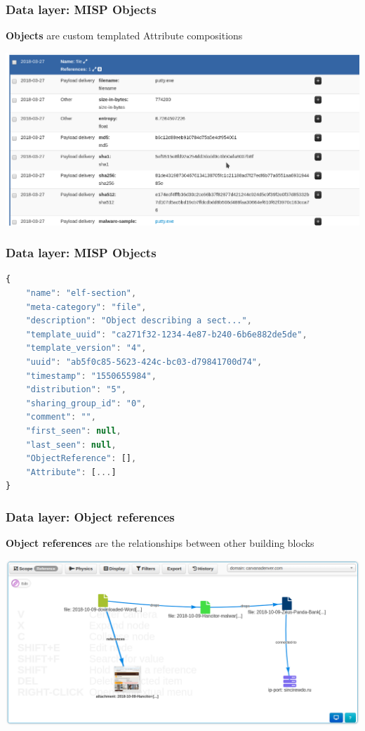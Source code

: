 \begin{frame}
    \frametitle{Data layer: MISP Objects}
        {\bf Objects} are custom templated Attribute compositions
        \begin{center}
            \includegraphics[width=1.0\linewidth]{object.png}
        \end{center}
\end{frame}

\begin{frame}[fragile]
    \frametitle{Data layer: MISP Objects}
        \begin{lstlisting}[language=javascript,firstnumber=1]
{
    "name": "elf-section",
    "meta-category": "file",
    "description": "Object describing a sect...",
    "template_uuid": "ca271f32-1234-4e87-b240-6b6e882de5de",
    "template_version": "4",
    "uuid": "ab5f0c85-5623-424c-bc03-d79841700d74",
    "timestamp": "1550655984",
    "distribution": "5",
    "sharing_group_id": "0",
    "comment": "",
    "first_seen": null,
    "last_seen": null,
    "ObjectReference": [],
    "Attribute": [...]
}
\end{lstlisting}
\end{frame}

\begin{frame}[fragile]
    \frametitle{Data layer: Object references}
    {\bf Object references} are the relationships between other building blocks
    \begin{center}
        \includegraphics[width=1.0\linewidth]{screenshots/eventgraph.png}
    \end{center}
\end{frame}

